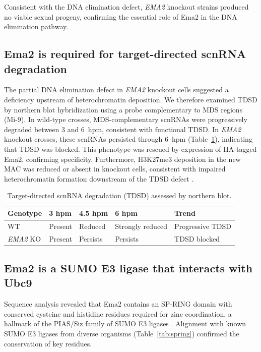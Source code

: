 \documentclass[11pt,a4paper]{article}
\begin{document}
Consistent with the DNA elimination defect, \textit{EMA2} knockout strains produced no viable sexual progeny, confirming the essential role of Ema2 in the DNA elimination pathway.

\subsection{Ema2 is required for target-directed scnRNA degradation}

The partial DNA elimination defect in \textit{EMA2} knockout cells suggested a deficiency upstream of heterochromatin deposition. We therefore examined TDSD by northern blot hybridization using a probe complementary to MDS regions (Mi-9). In wild-type crosses, MDS-complementary scnRNAs were progressively degraded between 3 and 6~hpm, consistent with functional TDSD. In \textit{EMA2} knockout crosses, these scnRNAs persisted through 6~hpm (Table~\ref{tab:tdsd}), indicating that TDSD was blocked. This phenotype was rescued by expression of HA-tagged Ema2, confirming specificity. Furthermore, H3K27me3 deposition in the new MAC was reduced or absent in knockout cells, consistent with impaired heterochromatin formation downstream of the TDSD defect \citep{Liu2007}.

\begin{table}[htbp]
\centering
\caption{Target-directed scnRNA degradation (TDSD) assessed by northern blot.}
\label{tab:tdsd}
\begin{tabular}{lllll}
\toprule
\textbf{Genotype} & \textbf{3 hpm} & \textbf{4.5 hpm} & \textbf{6 hpm} & \textbf{Trend} \\
\midrule
WT & Present & Reduced & Strongly reduced & Progressive TDSD \\
\textit{EMA2} KO & Present & Persists & Persists & TDSD blocked \\
\bottomrule
\end{tabular}
\end{table}

\subsection{Ema2 is a SUMO E3 ligase that interacts with Ubc9}

Sequence analysis revealed that Ema2 contains an SP-RING domain with conserved cysteine and histidine residues required for zinc coordination, a hallmark of the PIAS/Siz family of SUMO E3 ligases \citep{Gareau2010, Flotho2013}. Alignment with known SUMO E3 ligases from diverse organisms (Table~\ref{tab:spring}) confirmed the conservation of key residues.
\end{document}
